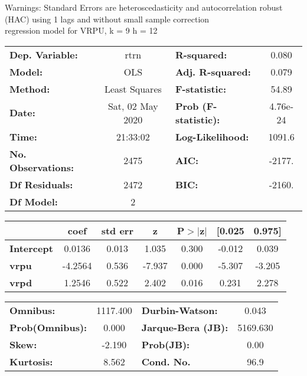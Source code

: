 Warnings: \newline
 [1] Standard Errors are heteroscedasticity and autocorrelation robust (HAC) using 1 lags and without small sample correction\\ 

regression model for VRPU, k = 9 h = 12\begin{center}
\begin{tabular}{lclc}
\toprule
\textbf{Dep. Variable:}    &       rtrn       & \textbf{  R-squared:         } &     0.080   \\
\textbf{Model:}            &       OLS        & \textbf{  Adj. R-squared:    } &     0.079   \\
\textbf{Method:}           &  Least Squares   & \textbf{  F-statistic:       } &     54.89   \\
\textbf{Date:}             & Sat, 02 May 2020 & \textbf{  Prob (F-statistic):} &  4.76e-24   \\
\textbf{Time:}             &     21:33:02     & \textbf{  Log-Likelihood:    } &    1091.6   \\
\textbf{No. Observations:} &        2475      & \textbf{  AIC:               } &    -2177.   \\
\textbf{Df Residuals:}     &        2472      & \textbf{  BIC:               } &    -2160.   \\
\textbf{Df Model:}         &           2      & \textbf{                     } &             \\
\bottomrule
\end{tabular}
\begin{tabular}{lcccccc}
                   & \textbf{coef} & \textbf{std err} & \textbf{z} & \textbf{P$> |$z$|$} & \textbf{[0.025} & \textbf{0.975]}  \\
\midrule
\textbf{Intercept} &       0.0136  &        0.013     &     1.035  &         0.300        &       -0.012    &        0.039     \\
\textbf{vrpu}      &      -4.2564  &        0.536     &    -7.937  &         0.000        &       -5.307    &       -3.205     \\
\textbf{vrpd}      &       1.2546  &        0.522     &     2.402  &         0.016        &        0.231    &        2.278     \\
\bottomrule
\end{tabular}
\begin{tabular}{lclc}
\textbf{Omnibus:}       & 1117.400 & \textbf{  Durbin-Watson:     } &    0.043  \\
\textbf{Prob(Omnibus):} &   0.000  & \textbf{  Jarque-Bera (JB):  } & 5169.630  \\
\textbf{Skew:}          &  -2.190  & \textbf{  Prob(JB):          } &     0.00  \\
\textbf{Kurtosis:}      &   8.562  & \textbf{  Cond. No.          } &     96.9  \\
\bottomrule
\end{tabular}
\end{center}

